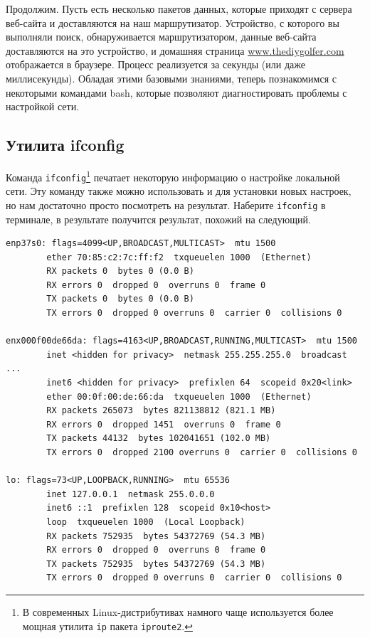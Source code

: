 \documentclass[a4paper,12pt,final,openany]{extbook}
\begin{document}
Продолжим. Пусть есть несколько
пакетов данных, которые приходят с сервера веб-сайта и доставляются на
наш маршрутизатор. Устройство, с которого вы выполняли поиск,
обнаруживается маршрутизатором, данные веб-сайта доставляются на это устройство, и
домашняя страница
\href{http://www.thediygolfer.com}{www.thediygolfer.com} отображается в браузере. Процесс реализуется за секунды (или даже миллисекунды).
Обладая этими базовыми знаниями, теперь познакомимся с некоторыми
командами bash, которые позволяют диагностировать проблемы с настройкой сети.

\hypertarget{ifconfig}{%
\subsection{\texorpdfstring{\protect\hyperlink{ifconfig}{}Утилита
ifconfig}{Утилита ifconfig}}\label{ifconfig}}

Команда \texttt{ifconfig}\footnote{В современных Linux-дистрибутивах намного чаще используется более мощная утилита \texttt{ip} пакета \texttt{iproute2}.} печатает некоторую информацию о настройке локальной сети.
Эту команду также можно использовать и для
установки новых настроек, но нам достаточно просто посмотреть на
результат. Наберите \texttt{ifconfig} в терминале, в результате
получится результат, похожий на следующий.
\begin{verbatim}
enp37s0: flags=4099<UP,BROADCAST,MULTICAST>  mtu 1500
        ether 70:85:c2:7c:ff:f2  txqueuelen 1000  (Ethernet)
        RX packets 0  bytes 0 (0.0 B)
        RX errors 0  dropped 0  overruns 0  frame 0
        TX packets 0  bytes 0 (0.0 B)
        TX errors 0  dropped 0 overruns 0  carrier 0  collisions 0

enx000f00de66da: flags=4163<UP,BROADCAST,RUNNING,MULTICAST>  mtu 1500
        inet <hidden for privacy>  netmask 255.255.255.0  broadcast ...
        inet6 <hidden for privacy>  prefixlen 64  scopeid 0x20<link>
        ether 00:0f:00:de:66:da  txqueuelen 1000  (Ethernet)
        RX packets 265073  bytes 821138812 (821.1 MB)
        RX errors 0  dropped 1451  overruns 0  frame 0
        TX packets 44132  bytes 102041651 (102.0 MB)
        TX errors 0  dropped 2100 overruns 0  carrier 0  collisions 0

lo: flags=73<UP,LOOPBACK,RUNNING>  mtu 65536
        inet 127.0.0.1  netmask 255.0.0.0
        inet6 ::1  prefixlen 128  scopeid 0x10<host>
        loop  txqueuelen 1000  (Local Loopback)
        RX packets 752935  bytes 54372769 (54.3 MB)
        RX errors 0  dropped 0  overruns 0  frame 0
        TX packets 752935  bytes 54372769 (54.3 MB)
        TX errors 0  dropped 0 overruns 0  carrier 0  collisions 0
\end{verbatim}
\end{document}
